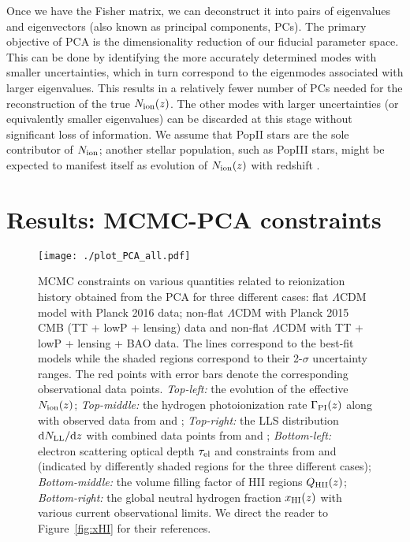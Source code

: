 \documentclass[useAMS,usenatbib]{mnras}
\newcommand{\de}{{\rm d}}
\begin{document}
 Once we have the Fisher matrix, we can deconstruct it into pairs of eigenvalues and eigenvectors
 (also known as principal components, PCs). The primary objective of PCA is the dimensionality reduction of our
 fiducial parameter space. This can be done by identifying the more accurately determined modes
 with smaller uncertainties, which in turn correspond to the eigenmodes associated with larger
 eigenvalues. This results in a relatively fewer number of PCs needed for the reconstruction of the 
 true $N_{\rm ion}(z)$. The other modes with larger uncertainties (or equivalently smaller eigenvalues)
 can be discarded at this stage without significant loss of information.
 We assume that PopII stars are the sole contributor of $N_{\rm ion}$; another 
stellar population, such as PopIII stars, might be expected to manifest itself
as evolution of $N_{\rm ion}(z)$ with redshift \citep{mitra1,mitra2}.

\section{Results: MCMC-PCA constraints}
\label{sec:results}

\begin{figure*}
\centering
  \texttt{[image: ./plot\_PCA\_all.pdf]}
  \caption{MCMC constraints on various  quantities  related
  to reionization history obtained from the PCA for three different cases: flat $\Lambda$CDM model with 
  Planck 2016 data; non-flat $\Lambda$CDM with Planck 2015 CMB (TT + lowP + lensing) data and non-flat $\Lambda$CDM with
  TT + lowP + lensing + BAO data. The lines correspond to the best-fit models 
  while the shaded regions correspond to their 2-$\sigma$ uncertainty ranges. 
  The red points with error bars denote the corresponding
  observational data points.
  {\it Top-left:} the evolution of the effective $N_{\rm ion}(z)$;
  {\it Top-middle:} the hydrogen photoionization rate $\Gamma_{\rm PI}(z)$ 
  along with observed data from \citet{2011MNRAS.412.1926W} and \citet{2013MNRAS.436.1023B};
  {\it Top-right:} the LLS distribution $\de N_{\rm LL}/\de z$ with combined data
  points from \citet{2010ApJ...721.1448S} and \citet{2010ApJ...718..392P}; 
  {\it Bottom-left:} electron scattering optical depth $\tau_{\rm el}$  and 
  constraints from \citet{2016A&A...596A.107P} and \citet{2017arXiv170703452O} (indicated by 
differently shaded regions for the three different cases);  
  {\it Bottom-middle:} the volume filling factor of HII regions $Q_{\rm HII}(z)$;
  {\it Bottom-right:}  the global neutral hydrogen fraction $x_{\rm HI}(z)$ with various current
  observational limits. We direct the reader to Figure~\ref{fig:xHI} for their references.}
\label{fig:MCMC}
\end{figure*}
\end{document}
